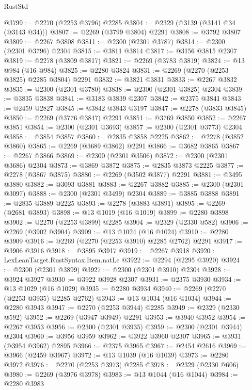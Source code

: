 \begin{lexlean}{RustStd}
\begin{coremodule}
@3799 := @2270 (@2253 @3796) @2285
@3804 := @2329 (@3139 (@3141 @34 (@3143 @34)))
@3807 := @2269 (@3799 @3804) @2291
@3808 := @3792 @3807
@3809 := @2267 @3808
@3811 := @2300 (@2301 @3787)
@3814 := @2300 (@2301 @3796) @2304
@3815 := @3811 @3814
@3817 := @3156 @3815 @2307
@3819 := @2278 (@3809 @3817)
@3821 := @2269 (@3783 @3819)
@3824 := @13 @984 (@16 @984)
@3825 := @2280 @3824
@3831 := @2269 (@2270 (@2253 @3825) @2285 @3804) @2291
@3832 := @3821 @3831
@3833 := @2267 @3832
@3835 := @2300 (@2301 @3780)
@3838 := @2300 (@2301 @3825) @2304
@3839 := @3835 @3838
@3841 := @3183 @3839 @2307
@3842 := @2375 @3841
@3843 := @2459 @2827
@3845 := @3842 @3843 @3197
@3847 := @2278 (@3833 @3845)
@3850 := @2269 (@3776 @3847) @2291
@3851 := @3769 @3850
@3852 := @2267 @3851
@3854 := @2300 (@2301 @3693)
@3857 := @2300 (@2301 @3773) @2304
@3858 := @3854 @3857
@3860 := @2835 @3858 @2225
@3862 := @2278 (@3852 @3860)
@3865 := @2269 (@3689 @3862) @2291
@3866 := @3682 @3865
@3867 := @2267 @3866
@3869 := @2300 (@2301 @3506)
@3872 := @2300 (@2301 @3686) @2304
@3873 := @3869 @3872
@3875 := @2835 @3873 @2225
@3877 := @2278 (@3867 @3875)
@3880 := @2269 (@3502 @3877) @2291
@3881 := @3495 @3880
@3882 := @3093 @3881
@3883 := @2267 @3882
@3885 := @2300 (@2301 @3097)
@3888 := @2300 (@2301 @3499) @2304
@3889 := @3885 @3888
@3891 := @2835 @3889 @2225
@3893 := @2278 (@3883 @3891)
@3895 := @2269 (@2681 @3893)
@3898 := @13 @1019 (@16 @1019)
@3899 := @2280 @3898
@3902 := @2270 (@2253 @3899) @2285
@3904 := @2329 (@2330 @582)
@3906 := @2269 (@3902 @3904)
@3909 := @13 @1024 (@16 @1024)
@3910 := @2280 @3909
@3916 := @2269 (@2270 (@2253 @3910) @2285 @2762) @2291
@3917 := @3906 @3916
@3918 := @3895 @3917
@3919 := @2267 @3918
@3920 := LexLeanTarget.RustSyntax.Item.natLe
@3922 := @2294 (@2295 @3920)
@3924 := @2300 (@2301 @3899)
@3927 := @2300 (@2301 @3910) @2304
@3928 := @3924 @3927
@3930 := @3922 @3928 @2307
@3931 := @2375 @3930
@3934 := @13 @1029 (@16 @1029)
@3935 := @2280 @3934
@3940 := @2269 (@2270 (@2253 @3935) @2285 @2762)
@3943 := @13 @1034 (@16 @1034)
@3944 := @2280 @3943
@3947 := @2270 (@2253 @3944) @2285
@3949 := @2329 (@2330 @592)
@3952 := @2269 (@3947 @3949) @2291
@3953 := @3940 @3952
@3954 := @2267 @3953
@3956 := @2300 (@2301 @3935)
@3959 := @2300 (@2301 @3944) @2304
@3960 := @3956 @3959
@3962 := @3922 @3960 @2307
@3965 := @3931 (@3954 @3962) @2895
@3966 := @2375 @3965
@3967 := @2454 @2616
@3969 := @3966 (@2459 @3967)
@3972 := @13 @1039 (@16 @1039)
@3973 := @2280 @3972
@3976 := @2270 (@2253 @3973) @2285
@3978 := @2329 (@2330 @606)
@3980 := @2269 (@3976 @3978)
@3983 := @13 @1044 (@16 @1044)
@3984 := @2280 @3983

\end{coremodule}
\end{lexlean}
